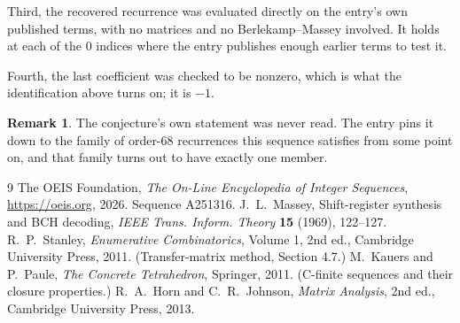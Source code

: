 \documentclass[11pt,a4paper]{article}
\theoremstyle{plain}
\theoremstyle{definition}
\newtheorem{remark}[theorem]{Remark}
\begin{document}
Third, the recovered recurrence was evaluated directly on the entry's own published terms, with
no matrices and no Berlekamp--Massey involved. It holds at each of the $0$ indices where
the entry publishes enough earlier terms to test it.

Fourth, the last coefficient was checked to be nonzero, which is what the identification above
turns on; it is $-1$.

\begin{remark}
The conjecture's own statement was never read. The entry pins it down to the family of
order-$68$ recurrences this sequence satisfies from some point on, and that family turns
out to have exactly one member.
\end{remark}

\begin{thebibliography}{9}
 The OEIS Foundation, \emph{The On-Line Encyclopedia of Integer
Sequences}, \url{https://oeis.org}, 2026. Sequence A251316.
 J.~L.~Massey, Shift-register synthesis and BCH decoding, \emph{IEEE
Trans. Inform. Theory} \textbf{15} (1969), 122--127.
 R.~P.~Stanley, \emph{Enumerative Combinatorics}, Volume 1, 2nd ed.,
Cambridge University Press, 2011. (Transfer-matrix method, Section 4.7.)
 M.~Kauers and P.~Paule, \emph{The Concrete Tetrahedron}, Springer, 2011.
(C-finite sequences and their closure properties.)
 R.~A.~Horn and C.~R.~Johnson, \emph{Matrix Analysis}, 2nd ed., Cambridge
University Press, 2013.
\end{thebibliography}
\end{document}
